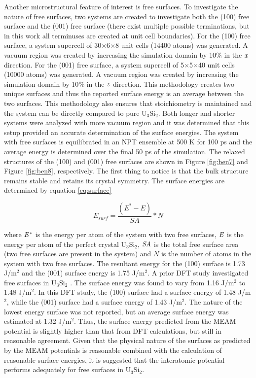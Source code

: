 \documentclass[review]{elsarticle}
\begin{document}
\FloatBarrier

Another microstructural feature of interest is free surfaces.  To investigate the nature of free surfaces, two systems are created to investigate both the (100) free surface and the (001) free surface (there exist multiple possible terminations, but in this work all terminuses are created at unit cell boundaries).  For the (100) free surface, a system supercell of 30$\times$6$\times$8 unit cells (14400 atoms) was generated.  A vacuum region was created by increasing the simulation domain by 10$\%$ in the $\it{x}$ direction.  For the (001) free surface, a system supercell of 5$\times$5$\times$40 unit cells (10000 atoms) was generated.  A vacuum region was created by increasing the simulation domain by 10$\%$ in the $\it{z}$ direction.  This methodology creates two unique surfaces and thus the reported surface energy is an average between the two surfaces.  This methodology also ensures that stoichiometry is maintained and the system can be directly compared to pure U$_{3}$Si$_{2}$.  Both longer and shorter systems were analyzed with more vacuum region and it was determined that this setup provided an accurate determination of the surface energies.  The system with free surfaces is equilibrated in an NPT ensemble at 500 K for 100 ps and the average energy is determined over the final 50 ps of the simulation.  The relaxed structures of the (100) and (001) free surfaces are shown in Figure \ref{fig:ben7} and Figure \ref{fig:ben8}, respectively.  The first thing to notice is that the bulk structure remains stable and retains its crystal symmetry.  The surface energies are determined by equation \ref{eq:surface}

\begin{equation}
\label{eq:surface}
E_{surf}= \frac{(E^{*} - E)}{SA} * N
\end{equation}

where $\it{E^{*}}$ is the energy per atom of the system with two free surfaces, $\it{E}$ is the energy per atom of the perfect crystal U$_{3}$Si$_{2}$, $\it{SA}$ is the total free surface area (two free surfaces are present in the system) and $\textit{N}$ is the number of atoms in the system with two free surfaces.  The resultant energy for the (100) surface is 1.73 J/m$^{2}$ and the (001) surface energy is 1.75 J/m$^{2}$.  A prior DFT study investigated free surfaces in U$_{3}$Si$_{2}$ \cite{anl_report, miao2017}.  The surface energy was found to vary from 1.16 J/m$^{2}$ to 1.48 J/m$^{2}$.  In this DFT study, the (100) surface had a surface energy of 1.48 J/m$^{2}$, while the (001) surface had a surface energy of 1.43 J/m$^{2}$.  The nature of the lowest energy surface was not reported, but an average surface energy was estimated at 1.32 J/m$^{2}$.  Thus, the surface energy predicted from the MEAM potential is slightly higher than that from DFT calculations, but still in reasonable agreement.  Given that the physical nature of the surfaces as predicted by the MEAM potentials is reasonable combined with the calculation of reasonable surface energies, it is suggested that the interatomic potential performs adequately for free surfaces in U$_{3}$Si$_{2}$.  
\end{document}
